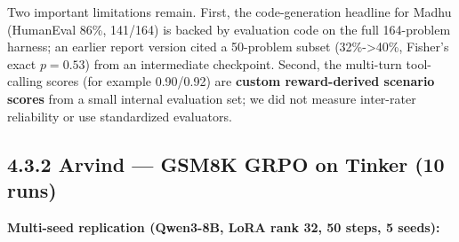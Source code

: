 \documentclass[
  american,
  11pt,
  a4paper,
  oneside]{report}
\begin{document}
Two important limitations remain. First, the code-generation headline
for Madhu (HumanEval 86\%, 141/164) is backed by evaluation code on the
full 164-problem harness; an earlier report version cited a 50-problem
subset (32\%-\textgreater40\%, Fisher's exact \(p{=}0.53\)) from an
intermediate checkpoint. Second, the multi-turn tool-calling scores (for
example 0.90/0.92) are \textbf{custom reward-derived scenario scores}
from a small internal evaluation set; we did not measure inter-rater
reliability or use standardized evaluators.

\subsection{4.3.2 Arvind --- GSM8K GRPO on Tinker (10
runs)}\label{arvind-gsm8k-grpo-on-tinker-10-runs}

\textbf{Multi-seed replication (Qwen3-8B, LoRA rank 32, 50 steps, 5
seeds):}
\end{document}
